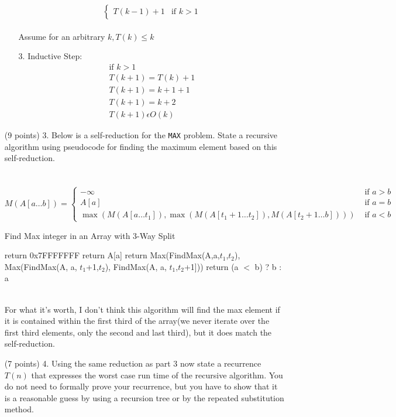 \documentclass[paper=a4,fontsize=11pt]{article}
\begin{document}
\begin{enumerate}
\begin{enumerate}
\[\begin{cases}
        T(k-1) + 1 & \text{if $k > 1$}
    \end{cases}
\]
\\Assume for an arbitrary $k, T(k) \leq k$
\item[3.] Inductive Step:
\begin{gather*}
\text{if $k > 1$}\\
T(k + 1) = T(k) + 1\\
T(k + 1) = k + 1 + 1\\  
T(k + 1) = k + 2\\
T(k + 1) \epsilon O(k)
\end{gather*}
\end{enumerate}
\item [(9 points) 3.] Below is a self-reduction for the \texttt{MAX} problem. State a recursive algorithm using pseudocode for finding the maximum element based on this self-reduction.\\\\\
\[
M(A[a\dots b]) = \left\{
\begin{array}{cl}
-\infty & \textrm{ if } a > b\\
A[a] & \textrm{ if } a = b\\
\max(M(A[a\dots t_1]), \max(M(A[t_1+1\dots t_2]), M(A[t_2+1\dots b]))) & \textrm{ if } a < b
\end{array}
\right.
\]
\begin{algorithm}
\caption{Find Max integer in an Array with 3-Way Split}
\label{array-sum}
\begin{algorithmic}[1]
        \State return 0x7FFFFFFF
        \State return A[a]
        \State return Max(FindMax(A,a,$t_1$,$t_2$), Max(FindMax(A, a, $t_1$+1,$t_2$), FindMax(A, a, $t_1$,$t_2$+1]))
    \EndIf
\EndProcedure
{}
    return (a $<$ b) ? b : a
\EndProcedure
\end{algorithmic}
\end{algorithm}\\
For what it's worth, I don't think this algorithm will find the max element if it is contained within the first third of the array(we never iterate over the first third elements, only the second and last third), but it does match the self-reduction.
\item [(7 points) 4.] Using the same reduction as part 3 now state a recurrence $T(n)$ that expresses the worst case run time of the recursive algorithm. You do not need to formally prove your recurrence, but you have to show that it is a reasonable guess by using a recursion tree or by the repeated substitution method.

\end{enumerate}
\end{document}
